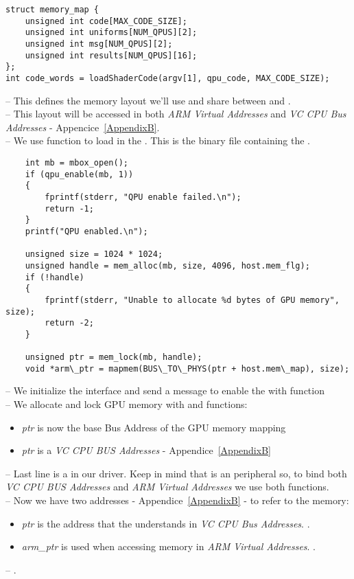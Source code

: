 \begin{lstlisting}
struct memory_map {
    unsigned int code[MAX_CODE_SIZE];
    unsigned int uniforms[NUM_QPUS][2];
    unsigned int msg[NUM_QPUS][2];
    unsigned int results[NUM_QPUS][16];
};
int code_words = loadShaderCode(argv[1], qpu_code, MAX_CODE_SIZE);
\end{lstlisting}
-- This defines the memory layout we’ll use and share between  and .\\
-- This layout will be accessed in both \emph{ARM Virtual Addresses} and \emph{VC CPU Bus Addresses} - Appencice~\ref{AppendixB}.\\
-- We use  function to load  in the \ram. This is the binary file containing the .
\newpage


\begin{lstlisting}
    int mb = mbox_open();
    if (qpu_enable(mb, 1))
    {
        fprintf(stderr, "QPU enable failed.\n");
        return -1;
    }
    printf("QPU enabled.\n");

    unsigned size = 1024 * 1024;
    unsigned handle = mem_alloc(mb, size, 4096, host.mem_flg);
    if (!handle)
    {
        fprintf(stderr, "Unable to allocate %d bytes of GPU memory", size);
        return -2;
    }

    unsigned ptr = mem_lock(mb, handle);
    void *arm\_ptr = mapmem(BUS\_TO\_PHYS(ptr + host.mem\_map), size);
\end{lstlisting}
-- We initialize the \mail{} interface and send a message to enable the \qpu{} with  \mail{} function\\
-- We allocate and lock GPU memory with  and  \mail{} functions:
\begin{itemize}
	\item \emph{ptr} is now the base Bus Address of the GPU memory mapping
	\item \emph{ptr} is a \emph{VC CPU BUS Addresses} - Appendice~\ref{AppendixB}
\end{itemize}
-- Last line is a  in our driver. Keep in mind that \vc{} is an \cpu{} peripheral so, to bind both \emph{VC CPU BUS Addresses} and \emph{ARM Virtual Addresses} we use both  functions.\\
-- Now we have two addresses - Appendice~\ref{AppendixB} - to refer to the memory:
\begin{itemize}
	\item \emph{ptr} is the address that the \vc{} understands in \emph{VC CPU Bus Addresses}. .
	\item \emph{arm\_ptr} is used when accessing \cpu{} memory in \emph{ARM Virtual Addresses}. .
\end{itemize}
-- .
\vspace{5mm}


